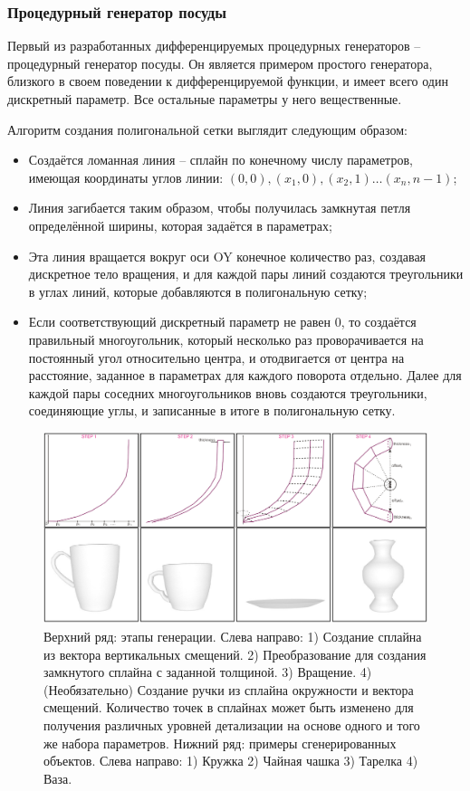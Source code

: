 \documentclass[a4paper,hidelinks,12pt]{article}
\begin{document}
\subsubsection{Процедурный генератор посуды}
Первый из разработанных дифференцируемых процедурных генераторов – процедурный генератор посуды. Он является примером простого генератора, близкого в своем поведении к дифференцируемой функции, и имеет всего один дискретный параметр. Все остальные параметры у него вещественные. 
\par
Алгоритм создания полигональной сетки выглядит следующим образом:
\begin{itemize}
    \item Создаётся ломанная линия – сплайн по конечному числу параметров, имеющая координаты углов линии: $(0, 0), (x_1, 0), (x_2, 1) … (x_n, n-1)$;
    \item Линия загибается таким образом, чтобы получилась замкнутая петля определённой ширины, которая задаётся в параметрах;
    \item Эта линия вращается вокруг оси OY конечное количество раз, создавая дискретное тело вращения, и для каждой пары линий создаются треугольники в углах линий, которые добавляются в полигональную сетку;
    \item Если соответствующий дискретный параметр не равен 0, то создаётся правильный многоугольник, который несколько раз проворачивается на постоянный угол относительно центра, и отодвигается от центра на расстояние, заданное в параметрах для каждого поворота отдельно. Далее для каждой пары соседних многоугольников вновь создаются треугольники, соединяющие углы, и записанные в итоге в полигональную сетку.
\end{itemize}

\begin{figure}[H]
\begin{center}
	\includegraphics[width=15 cm]{algorithm.png}
	\caption{Верхний ряд: этапы генерации. Слева направо: 1) Создание сплайна из вектора вертикальных смещений. 2) Преобразование для создания замкнутого сплайна с заданной толщиной. 3) Вращение. 4) (Необязательно) Создание ручки из сплайна окружности и вектора смещений. Количество точек в сплайнах может быть изменено для получения различных уровней детализации на основе одного и того же набора параметров. Нижний ряд: примеры сгенерированных объектов. Слева направо: 1) Кружка 2) Чайная чашка 3) Тарелка 4) Ваза.}
 	\label{fig_alg}
\end{center}
\end{figure}
\end{document}
